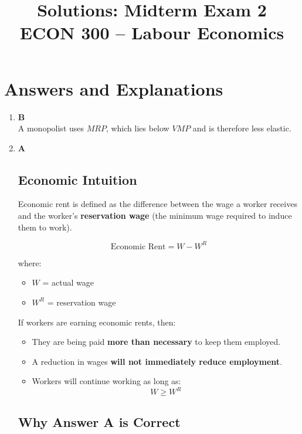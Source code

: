 \documentclass[12pt]{article}
\begin{document}
\title{\textbf{Solutions: Midterm Exam 2}\\
ECON 300 -- Labour Economics}
\date{}
\maketitle

\section*{Answers and Explanations}

\begin{enumerate}

\item \textbf{B} \\
A monopolist uses $MRP$, which lies below $VMP$ and is therefore less elastic.

\item \textbf{A}

\subsection*{Economic Intuition}

Economic rent is defined as the difference between the wage a worker receives and the worker’s \textbf{reservation wage} (the minimum wage required to induce them to work).

\[
\text{Economic Rent} = W - W^{R}
\]

where:
\begin{itemize}
    \item \(W\) = actual wage
    \item \(W^{R}\) = reservation wage
\end{itemize}


If workers are earning economic rents, then:

\begin{itemize}
    \item They are being paid \textbf{more than necessary} to keep them employed.
    \item A reduction in wages \textbf{will not immediately reduce employment}.
    \item Workers will continue working as long as:
    \[
    W \geq W^{R}
    \]
\end{itemize}

\subsection*{Why Answer A is Correct}


\end{enumerate}
\end{document}
